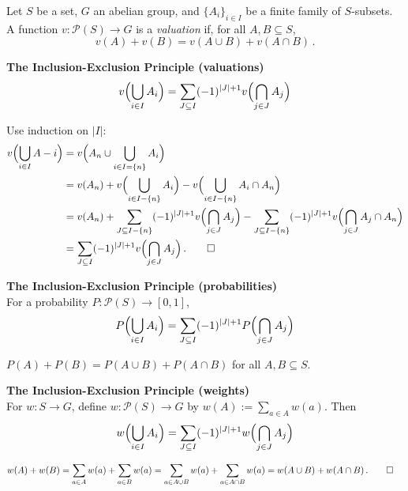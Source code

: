 \documentclass[a4paper]{article}
\let\oldendproof\endproof
\renewenvironment{proof}[1][\proofname]{%
  \oldproof[\scshape \noindent {\bfseries \text{Proof}}]%
}{\oldendproof}
\newenvironment{thm}[1]{
	\begin{framed}
	\noindent
	{\bfseries #1}\\}{\setlength{\itemsep}{0pt}
	\end{framed}
}
\newcommand{\Pf}{\mathcal{P}}
\newcommand{\lr}[1]{\Bigl( #1 \Bigr)}
\begin{document}
Let $S$ be a set, $G$ an abelian group, and $\{A_i\}_{i \in I}$ be a finite family of
$S$-subsets.\\
A function $v : \Pf(S) \to G$ is a \emph{valuation} if, for all $A, B \subseteq S$,
	\[ v(A) + v(B) = v(A \cup B) + v(A \cap B)\,.\]

\begin{thm}{The Inclusion-Exclusion Principle (valuations)}
\[
    v\Bigl(\bigcup_{i \in I} A_i \Bigr)
  = \sum_{J \subseteq I} (-1)^{|J|+1} v\Bigl(\bigcap_{j \in J} A_j \Bigr)
\]
\end{thm}
	
\begin{proof}
Use induction on $|I|$:
\begin{align*}	
        v\Bigl(\bigcup_{i \in I} A-i\Bigr) & = v\Bigl(A_n \cup \bigcup_{i \in I=\{n\}}
        A_i\Bigr)\\
	& = v(A_n) + v\lr{\bigcup_{i \in I - \{n\}} A_i} - v\Bigl(\bigcup_{i \in I-\{n\}} A_i
\cap A_n\Bigr)\\
	& = v(A_n) + \sum_{J \subseteq I-\{n\}} (-1)^{|J|+1} v\lr{\bigcap_{j \in J} A_j}
      - \sum_{J\subseteq I-\{n\}} (-1)^{|J|+1} v\Bigl(\bigcap_{j \in J} A_j \cap
      A_n\Bigr)\\
	& = \sum_{J \subseteq I} (-1)^{|J|+1} v\Bigl(\bigcap_{j \in J} A_j\Bigr)\,.\qedhere
\end{align*}
\end{proof}

\begin{thm}{The Inclusion-Exclusion Principle (probabilities)}
For a probability $P : \Pf(S) \to [0,1]$,
	\[ P \Bigl(\bigcup_{i \in I} A_i\Bigr)
  = \sum_{J \subseteq I} (-1)^{|J|+1} P\Bigl(\bigcap_{j \in J} A_j\Bigr)\]
\end{thm}

\begin{proof}
$P(A) + P(B) = P(A \cup B) + P(A \cap B)$ for all $A,B \subseteq S$.
\end{proof}

\begin{thm}{The Inclusion-Exclusion Principle (weights)}
For $w: S \to G$, define $w: \Pf(S) \to G$ by $w(A) := \sum_{a \in A} w(a)$.
Then
	\[ w\lr{\bigcup_{i \in I} A_i} = \sum_{J \subseteq I} (-1)^{|J|+1} w\lr{\bigcap_{j \in
J}A_j}\]
\end{thm}

\begin{proof}
\begin{align*}
   w(A) + w(B)
&= \sum_{a \in A} w(a) + \sum_{a \in B} w(a)
 = \sum_{a \in A \cup B} w(a) + \sum_{a \in A \cap B} w(a)
 = w(A \cup B) + w(A \cap B)\,.\qedhere
\end{align*}
\end{proof}
\end{document}
